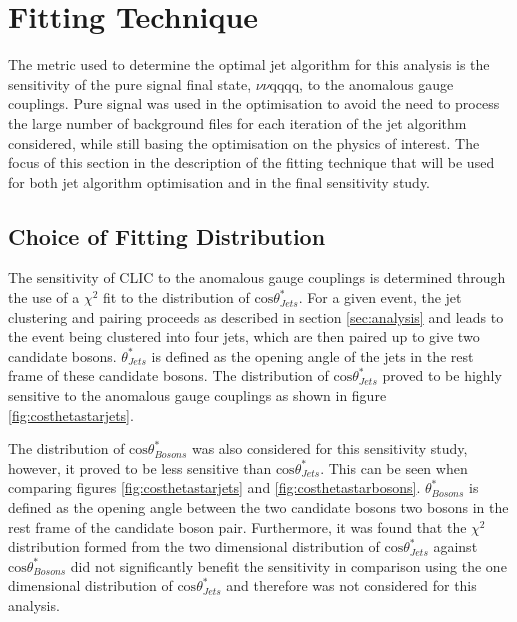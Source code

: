 \section{Fitting Technique}
The metric used to determine the optimal jet algorithm for this analysis is the sensitivity of the pure signal final state, $\nu\nu\text{qqqq}$, to the anomalous gauge couplings.  Pure signal was used in the optimisation to avoid the need to process the large number of background files for each iteration of the jet algorithm considered, while still basing the optimisation on the physics of interest.  The focus of this section in the description of the fitting technique that will be used for both jet algorithm optimisation and in the final sensitivity study.

\subsection{Choice of Fitting Distribution}
The sensitivity of CLIC to the anomalous gauge couplings is determined through the use of a $\chi^{2}$ fit to the distribution of $\text{cos}\theta^{*}_{Jets}$.  For a given event, the jet clustering and pairing proceeds as described in section \ref{sec:analysis} and leads to the event being clustered into four jets, which are then paired up to give two candidate bosons.  $\theta^{*}_{Jets}$ is defined as the opening angle of the jets in the rest frame of these candidate bosons.  The distribution of $\text{cos}\theta^{*}_{Jets}$ proved to be highly sensitive to the anomalous gauge couplings as shown in figure \ref{fig:costhetastarjets}.

The distribution of $\text{cos}\theta^{*}_{Bosons}$ was also considered for this sensitivity study, however, it proved to be less sensitive than $\text{cos}\theta^{*}_{Jets}$.  This can be seen when comparing figures \ref{fig:costhetastarjets} and \ref{fig:costhetastarbosons}.  $\theta^{*}_{Bosons}$ is defined as the opening angle between the two candidate bosons two bosons in the rest frame of the candidate boson pair.  Furthermore, it was found that the $\chi^{2}$ distribution formed from the two dimensional distribution of $\text{cos}\theta^{*}_{Jets}$ against $\text{cos}\theta^{*}_{Bosons}$ did not significantly benefit the sensitivity in comparison using the one dimensional distribution of $\text{cos}\theta^{*}_{Jets}$ and therefore was not considered for this analysis.

